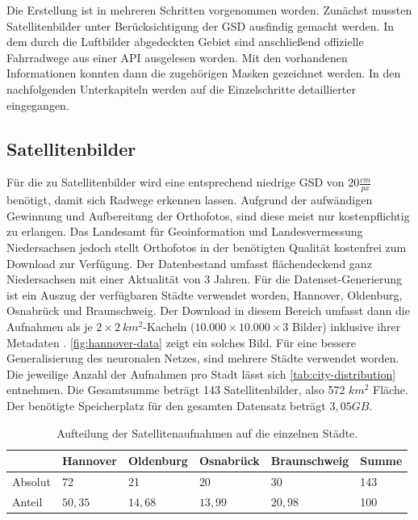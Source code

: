 Die Erstellung ist in mehreren Schritten vorgenommen worden.
Zunächst mussten Satellitenbilder unter Berücksichtigung der \ac{GSD} ausfindig gemacht werden.
In dem durch die Luftbilder abgedeckten Gebiet sind anschließend offizielle Fahrradwege aus einer API ausgelesen worden.
Mit den vorhandenen Informationen konnten dann die zugehörigen Masken gezeichnet werden.
In den nachfolgenden Unterkapiteln werden auf die Einzelschritte detaillierter eingegangen.

\subsection{Satellitenbilder}

Für die zu Satellitenbilder wird eine entsprechend niedrige \ac{GSD} von $20 \frac{cm}{px}$ benötigt, damit sich Radwege erkennen lassen. 
Aufgrund der aufwändigen Gewinnung und Aufbereitung der Orthofotos, sind diese meist nur kostenpflichtig zu erlangen.
Das Landesamt für Geoinformation und Landesvermessung Niedersachsen jedoch stellt Orthofotos in der benötigten Qualität kostenfrei zum Download zur Verfügung.
Der Datenbestand umfasst flächendeckend ganz Niedersachsen mit einer Aktualität von 3 Jahren.
Für die Datenset-Generierung ist ein Auszug der verfügbaren Städte verwendet worden, Hannover, Oldenburg, Osnabrück und Braunschweig. 
Der Download in diesem Bereich umfasst dann die Aufnahmen als je $2{\times}2 ~km^2$-Kacheln ($10.000{\times}10.000{\times}3$ Bilder) inklusive ihrer Metadaten \cite{.26.10.2022}.
\autoref{fig:hannover-data} zeigt ein solches Bild. 
Für eine bessere Generalisierung des neuronalen Netzes, sind mehrere Städte verwendet worden.
Die jeweilige Anzahl der Aufnahmen pro Stadt lässt sich \autoref{tab:city-distribution} entnehmen.
Die Gesamtsumme beträgt 143 Satellitenbilder, also 572 $km^2$ Fläche.
Der benötigte Speicherplatz für den gesamten Datensatz beträgt $3,05 GB$.

\begin{table}
	\centering
	\begin{tabular}{l|l|l|l|l|l}
		& Hannover & Oldenburg & Osnabrück & Braunschweig & Summe\\
		\midrule
		Absolut & 72 & 21 & 20 & 30 & 143\\
		Anteil & $50,35$ & $14,68$ & $13,99$ & $20,98$ & 100 \\
	\end{tabular}
	\caption{Aufteilung der Satellitenaufnahmen auf die einzelnen Städte.}
	\label{tab:city-distribution}
\end{table}


